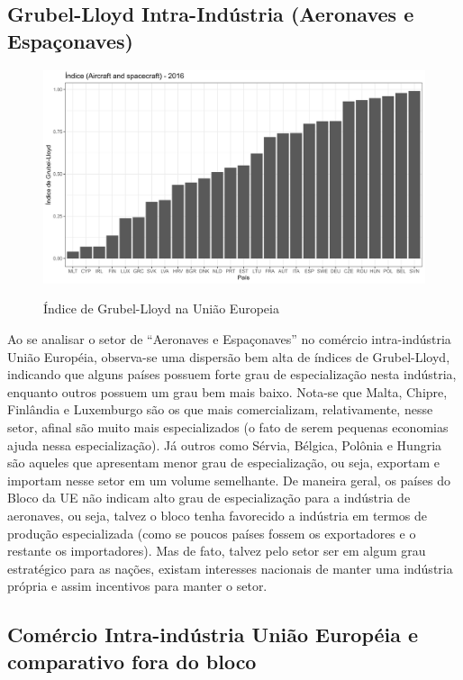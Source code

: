 \subsection{Grubel-Lloyd Intra-Indústria (Aeronaves e Espaçonaves)}

\begin{figure}[!h]
    \centering
    \caption{Índice de Grubel-Lloyd na União Europeia}
    \includegraphics*[width = 0.8\linewidth]{../plots/gl_eu.png}
    \label{fig:gl-ue}
\end{figure}

Ao se analisar o setor de “Aeronaves e Espaçonaves” no comércio intra-indústria União Européia, observa-se uma dispersão bem alta de índices de Grubel-Lloyd, indicando que alguns países possuem forte grau de especialização nesta indústria, enquanto outros possuem um grau bem mais baixo. Nota-se que Malta, Chipre, Finlândia e Luxemburgo são os que mais comercializam, relativamente, nesse setor, afinal são muito mais especializados (o fato de serem pequenas economias ajuda nessa especialização). Já outros como Sérvia, Bélgica, Polônia e Hungria são aqueles que apresentam menor grau de especialização, ou seja, exportam e importam nesse setor em um volume semelhante. De maneira geral, os países do Bloco da UE não indicam alto grau de especialização para a indústria de aeronaves, ou seja, talvez o bloco tenha favorecido a indústria em termos de produção especializada (como se poucos países fossem os exportadores e o restante os importadores). Mas de fato, talvez pelo setor ser em algum grau estratégico para as nações, existam interesses nacionais de manter uma indústria própria e assim incentivos para manter o setor.

\subsection{Comércio Intra-indústria União Européia e comparativo fora do bloco}

